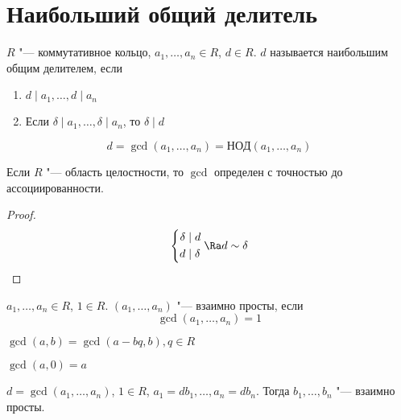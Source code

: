 \section{Наибольший общий делитель}

\begin{Def}
	$R$ "--- коммутативное кольцо, $a_{1}, \dots, a_{n} \in R$, $d \in R$. $d$ называется наибольшим общим делителем, если
	\begin{enumerate}
		\item $d \mid a_{1}, \dots, d \mid a_{n}$
		\item Если $\delta \mid a_{1}, \dots, \delta \mid a_{n}$, то $\delta \mid d$
	\end{enumerate}
	\[ d = \gcd \left(a_{1}, \dots, a_{n}\right) = НОД(a_1, \dots, a_n) \]
\end{Def}

\begin{Rem}
	Если $R$ "--- область целостности, то $\gcd$ определен с точностью до ассоциированности.
\end{Rem}
\begin{proof}
	\begin{gather*}
		\left\{\begin{aligned}
			\delta &\mid d \\
			d &\mid \delta
		\end{aligned}\right.
		\Ra d \sim \delta
	\end{gather*}
\end{proof}

\begin{Def}
	$a_{1}, \dots, a_{n} \in R$, $1 \in R$.
	$\left(a_{1}, \dots, a_{n}\right)$ "--- взаимно просты, если
	\[ \gcd \left(a_{1}, \dots, a_{n}\right) = 1 \]
\end{Def}

\begin{conseq}
	$\gcd \left(a, b\right) = \gcd \left(a - bq, b\right), q \in R$
\end{conseq}
\begin{conseq}
	$\gcd \left(a, 0\right) = a$
\end{conseq}
\begin{conseq}
	$d = \gcd \left(a_{1}, \dots, a_{n}\right)$, $1 \in R$, $a_{1} = db_{1}, \dots, a_{n} = db_{n}$.
	Тогда $b_{1}, \dots, b_{n}$ "--- взаимно просты.
\end{conseq}

